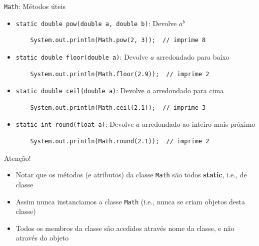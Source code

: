 \documentclass[portuguese, aspectratio=169, xcolor=table]{beamer}
\begin{document}
\begin{frame}[fragile]{\texttt{Math}: Métodos úteis}
\begin{itemize}
\item \texttt{static double pow(double a, double b)}: Devolve $a^b$
\begin{verbatim}
    System.out.println(Math.pow(2, 3));  // imprime 8
\end{verbatim}
\item \texttt{static double floor(double a)}: Devolve $a$ arredondado para baixo
\begin{verbatim}
    System.out.println(Math.floor(2.9));  // imprime 2
\end{verbatim}
\item \texttt{static double ceil(double a)}: Devolve $a$ arredondado para cima
\begin{verbatim}
    System.out.println(Math.ceil(2.1));  // imprime 3
\end{verbatim}
\item \texttt{static int round(float a)}: Devolve $a$ arredondado ao inteiro mais próximo
\begin{verbatim}
    System.out.println(Math.round(2.1));  // imprime 2
\end{verbatim}
\end{itemize}
\vfill

\begin{alertblock}{Atenção!}
\begin{itemize}
    \item Notar que os métodos (e atributos) da classe \texttt{Math} são todos \textbf{static}, i.e., de classe
    \item Assim nunca instanciamos a classe \texttt{Math} (i.e., nunca se criam objetos desta classe)
    \item Todos os membros da classe são acedidos através nome da classe, e não através do objeto
\end{itemize}
\end{alertblock}
\end{frame}
\end{document}
